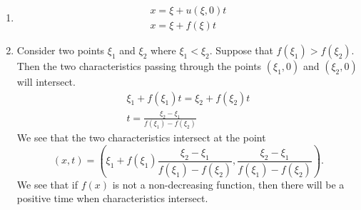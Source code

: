 \begin{Solution}
  \begin{enumerate} 
  \item 
    \begin{gather*}
      x = \xi + u(\xi,0) t
      \\
      x = \xi + f(\xi) t
    \end{gather*}
  \item 
    Consider two points $\xi_1$ and $\xi_2$ where $\xi_1 < \xi_2$.  Suppose that 
    $f(\xi_1) > f(\xi_2)$.  Then the two characteristics passing through the points
    $(\xi_1,0)$ and $(\xi_2,0)$ will intersect.  
    \begin{gather*}
      \xi_1 + f(\xi_1) t = \xi_2 + f(\xi_2) t
      \\
      t = \frac{\xi_2 - \xi_1}{f(\xi_1) - f(\xi_2)}
    \end{gather*}
    We see that the two characteristics intersect at the point
    \[
    (x,t) = \left( \xi_1 + f(\xi_1) \frac{\xi_2 - \xi_1}{f(\xi_1) - f(\xi_2)},
      \frac{\xi_2 - \xi_1}{f(\xi_1) - f(\xi_2)} \right).
    \]
    We see that if $f(x)$ is not a non-decreasing function, then there will 
    be a positive time when characteristics intersect.


\end{enumerate}
\end{Solution}
